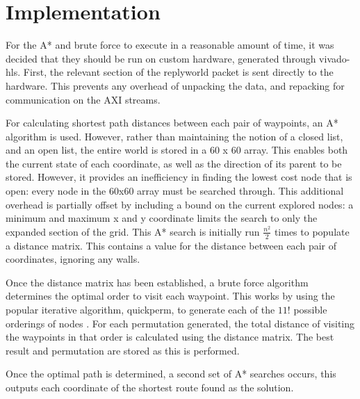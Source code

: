 \documentclass[a4paper, 11pt]{article}
\begin{document}
\section{Implementation} %
For the A* and brute force to execute in a reasonable amount of time, it was decided that
they should be run on custom hardware, generated through vivado-hls. 
First, the relevant section of the replyworld packet is sent directly to the
hardware. This prevents any overhead of unpacking the data, and repacking for
communication on the AXI streams. 
\par\bigskip\noindent
For calculating shortest path distances between each pair of
waypoints, an A* algorithm is used. However, rather than maintaining the notion of a
closed list, and an open list, the entire world is stored in a 60 x 60 array.
This enables both the current state of each coordinate, as well as the direction of
its parent to be stored. However, it provides an inefficiency in finding the
lowest cost node that is open: every node in the 60x60 array must be searched
through. This additional overhead is partially offset by including a bound on 
the current explored nodes: a minimum and maximum x and y coordinate limits the
search to only the expanded section of the grid. 
This A* search is initially run $\frac{n^2}{2}$ times to populate a distance
matrix. This contains a value for the distance between each pair of
coordinates, ignoring any walls. 
\par\bigskip\noindent
Once the distance matrix has been established, a brute force algorithm
determines the optimal order to visit each waypoint. This works by using the
popular iterative algorithm, quickperm, to generate each of the $11!$ possible orderings of
nodes \cite{quickperm}. For each permutation generated, the total distance of
visiting the waypoints in that order is calculated using the distance
matrix. The best result and permutation are stored as this is performed.
\par\bigskip\noindent
Once the optimal path is determined, a second set of A* searches occurs, this
outputs each coordinate of the shortest route found as the solution.
\end{document}

